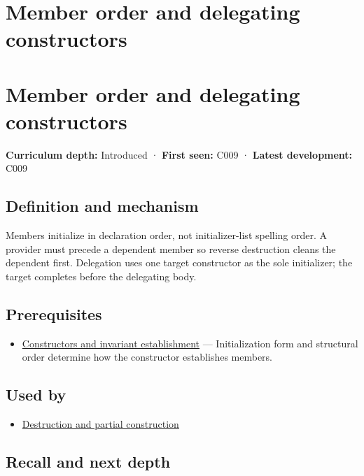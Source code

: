 \hypertarget{appendix-3cb49709605a}{}
\section*{Member order and delegating constructors}
\section{Member order and delegating constructors}\label{member-order-and-delegating-constructors}

\textbf{Curriculum depth:} Introduced · \textbf{First seen:} C009 · \textbf{Latest development:} C009

\subsection{Definition and mechanism}\label{definition-and-mechanism}

Members initialize in declaration order, not initializer-list spelling order. A provider must precede a dependent member so reverse destruction cleans the dependent first. Delegation uses one target constructor as the sole initializer; the target completes before the delegating body.

\subsection{Prerequisites}\label{prerequisites}

\begin{itemize}
\tightlist
\item
  \hyperref[appendix-7f8ec83d0886]{Constructors and invariant establishment} --- Initialization form and structural order determine how the constructor establishes members.
\end{itemize}

\subsection{Used by}\label{used-by}

\begin{itemize}
\tightlist
\item
  \hyperref[appendix-9bfe377cef7a]{Destruction and partial construction}
\end{itemize}

\subsection{Recall and next depth}\label{recall-and-next-depth}

